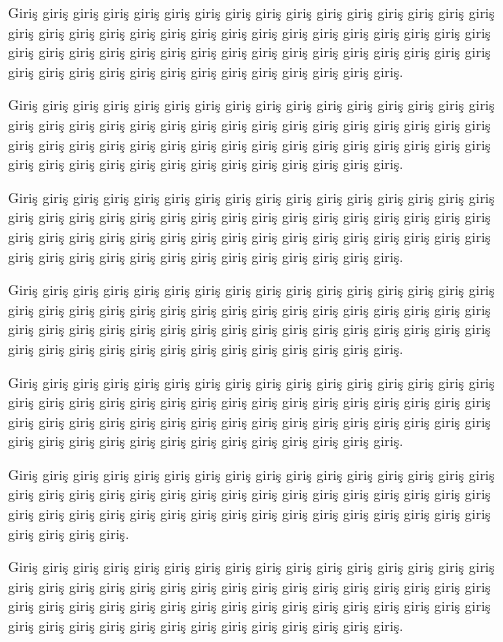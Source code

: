 Giriş giriş giriş giriş giriş giriş giriş giriş giriş giriş giriş giriş giriş giriş giriş giriş giriş giriş giriş giriş giriş giriş giriş giriş giriş giriş giriş giriş giriş giriş giriş giriş giriş giriş giriş giriş giriş giriş giriş giriş giriş giriş giriş giriş giriş giriş giriş giriş giriş giriş giriş giriş giriş giriş giriş giriş giriş giriş giriş giriş giriş.

Giriş giriş giriş giriş giriş giriş giriş giriş giriş giriş giriş giriş giriş giriş giriş giriş giriş giriş giriş giriş giriş giriş giriş giriş giriş giriş giriş giriş giriş giriş giriş giriş giriş giriş giriş giriş giriş giriş giriş giriş giriş giriş giriş giriş giriş giriş giriş giriş giriş giriş giriş giriş giriş giriş giriş giriş giriş giriş giriş giriş giriş.

Giriş giriş giriş giriş giriş giriş giriş giriş giriş giriş giriş giriş giriş giriş giriş giriş giriş giriş giriş giriş giriş giriş giriş giriş giriş giriş giriş giriş giriş giriş giriş giriş giriş giriş giriş giriş giriş giriş giriş giriş giriş giriş giriş giriş giriş giriş giriş giriş giriş giriş giriş giriş giriş giriş giriş giriş giriş giriş giriş giriş giriş. 

Giriş giriş giriş giriş giriş giriş giriş giriş giriş giriş giriş giriş giriş giriş giriş giriş giriş giriş giriş giriş giriş giriş giriş giriş giriş giriş giriş giriş giriş giriş giriş giriş giriş giriş giriş giriş giriş giriş giriş giriş giriş giriş giriş giriş giriş giriş giriş giriş giriş giriş giriş giriş giriş giriş giriş giriş giriş giriş giriş giriş giriş.

Giriş giriş giriş giriş giriş giriş giriş giriş giriş giriş giriş giriş giriş giriş giriş giriş giriş giriş giriş giriş giriş giriş giriş giriş giriş giriş giriş giriş giriş giriş giriş giriş giriş giriş giriş giriş giriş giriş giriş giriş giriş giriş giriş giriş giriş giriş giriş giriş giriş giriş giriş giriş giriş giriş giriş giriş giriş giriş giriş giriş giriş.

Giriş giriş giriş giriş giriş giriş giriş giriş giriş giriş giriş giriş giriş giriş giriş giriş giriş giriş giriş giriş giriş giriş giriş giriş giriş giriş giriş giriş giriş giriş giriş giriş giriş giriş giriş giriş giriş giriş giriş giriş giriş giriş giriş giriş giriş giriş giriş giriş giriş giriş giriş giriş.

Giriş giriş giriş giriş giriş giriş giriş giriş giriş giriş giriş giriş giriş giriş giriş giriş giriş giriş giriş giriş giriş giriş giriş giriş giriş giriş giriş giriş giriş giriş giriş giriş giriş giriş giriş giriş giriş giriş giriş giriş giriş giriş giriş giriş giriş giriş giriş giriş giriş giriş giriş giriş giriş giriş giriş giriş giriş giriş giriş giriş giriş.

